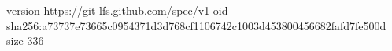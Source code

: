 version https://git-lfs.github.com/spec/v1
oid sha256:a73737e73665c0954371d3d768cf1106742c1003d453800456682fafd7fe500d
size 336
